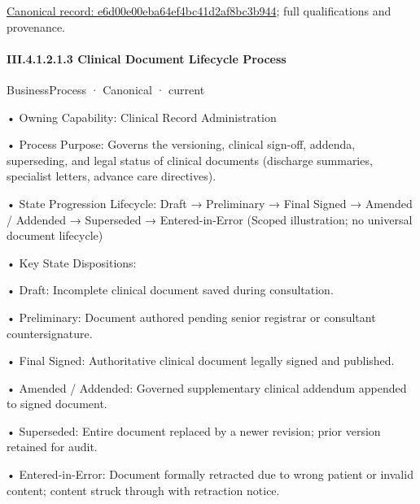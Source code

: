 {\footnotesize \href{../../../../../../../../continuum/business/business-function/e6d00e00eba64ef4bc41d2af8bc3b944.md}{Canonical record: e6d00e00eba64ef4bc41d2af8bc3b944}; full qualifications and provenance.}\par
\paragraph*{III.4.1.2.1.3 Clinical Document Lifecycle Process}
\label{navigation:III.4.1.2.1.3}

\label{element:eacdec16b96844b4963b8a960d1a8666}
{\small BusinessProcess · Canonical · current}\par

•
Owning Capability: Clinical Record Administration



•
Process Purpose: Governs the versioning, clinical sign-off, addenda, superseding, and legal status of clinical documents (discharge summaries, specialist letters, advance care directives).



•
State Progression Lifecycle: Draft → Preliminary → Final Signed → Amended / Addended → Superseded → Entered-in-Error   (Scoped illustration; no universal document lifecycle)



•
Key State Dispositions:



•
Draft: Incomplete clinical document saved during consultation.



•
Preliminary: Document authored pending senior registrar or consultant countersignature.



•
Final Signed: Authoritative clinical document legally signed and published.



•
Amended / Addended: Governed supplementary clinical addendum appended to signed document.



•
Superseded: Entire document replaced by a newer revision; prior version retained for audit.



•
Entered-in-Error: Document formally retracted due to wrong patient or invalid content; content struck through with retraction notice.



